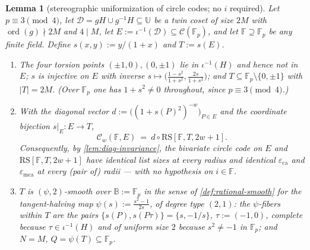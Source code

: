 \documentclass[11pt]{article}
\newtheorem{lemma}[lemma]{Lemma}
\theoremstyle{definition}
\theoremstyle{remark}
\newcommand{\F}{\mathbb{F}}
\newcommand{\B}{\mathbb{B}}
\newcommand{\RS}{\mathrm{RS}}
\newcommand{\eca}{\varepsilon_{\mathrm{ca}}}
\newcommand{\emca}{\varepsilon_{\mathrm{mca}}}
\newcommand{\UU}{\mathbb{U}}
\begin{document}
\begin{lemma}[stereographic uniformization of circle codes; no $i$ required]\label{lem:stereographic}
Let $p\equiv3\pmod4$, let $\mathcal D=gH\cup g^{-1}H\subseteq\UU$ be a twin coset of size $2M$ with $\operatorname{ord}(g)\nmid2M$ and $4\mid M$, let $E:=\iota^{-1}(\mathcal D)\subseteq\mathcal C(\F_p)$, and let $\F\supseteq\F_p$ be \emph{any} finite field. Define $s(x,y):=y/(1+x)$ and $T:=s(E)$.
\begin{enumerate}[label=\textup{(\roman*)}]
\item The four torsion points $(\pm1,0),(0,\pm1)$ lie in $\iota^{-1}(H)$ and hence not in $E$; $s$ is injective on $E$ with inverse $s\mapsto\bigl(\frac{1-s^2}{1+s^2},\frac{2s}{1+s^2}\bigr)$; and $T\subseteq\F_p\setminus\{0,\pm1\}$ with $|T|=2M$. \textup(Over $\F_p$ one has $1+s^2\ne0$ throughout, since $p\equiv3\pmod4$.\textup)
\item With the diagonal vector $d:=\bigl((1+s(P)^2)^{-w}\bigr)_{P\in E}$ and the coordinate bijection $s|_E:E\to T$,
\[
\mathcal C_w(\F,E)\ =\ d\circ\RS[\F,T,2w+1].
\]
Consequently, by \cref{lem:diag-invariance}, the bivariate circle code on $E$ and $\RS[\F,T,2w+1]$ have identical list sizes at every radius and identical $\eca$ and $\emca$ at every \textup(pair of\textup) radii --- with no hypothesis on $i\in\F$.
\item $T$ is $(\psi,2)$-smooth over $\B:=\F_p$ in the sense of \cref{def:rational-smooth} for the tangent-halving map $\psi(s):=\frac{s^2-1}{2s}$, of degree type $(2,1)$: the $\psi$-fibers within $T$ are the pairs $\{s(P),s(P\tau)\}=\{s,-1/s\}$, $\tau:=(-1,0)$, complete because $\tau\in\iota^{-1}(H)$ and of uniform size $2$ because $s^2\ne-1$ in $\F_p$; and $N=M$, $Q=\psi(T)\subseteq\F_p$.
\end{enumerate}
\end{lemma}
\end{document}
